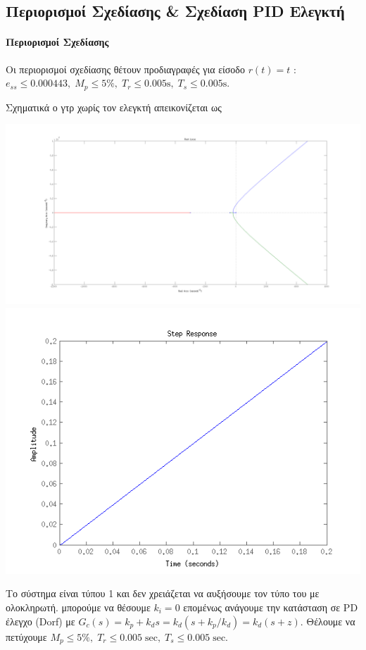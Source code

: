 \documentclass[a4paper,oneside, 10pt]{article}
\begin{document}
\subsection*{Περιορισμοί Σχεδίασης \& Σχεδίαση PID Ελεγκτή} 

\paragraph{Περιορισμοί Σχεδίασης} 

Οι περιορισμοί σχεδίασης θέτουν προδιαγραφές για είσοδο $r(t) = t $ : $e_{ss} \le 0.000443, \; M_p \le 5 \%, \; T_r \le 0.005 \mathrm s, \; T_s \le 0.005 \mathrm s$.

Σχηματικά ο γτρ χωρίς τον ελεγκτή απεικονίζεται ως

\includegraphics[width=\textwidth]{plant3_rlocus.png}
\includegraphics[width=\textwidth]{step3.png}


Το σύστημα είναι τύπου 1 και δεν χρειάζεται να αυξήσουμε τον τύπο του με ολοκληρωτή.  μπορούμε να θέσουμε $k_i = 0$ επομένως ανάγουμε την κατάσταση σε PD έλεγχο (Dorf) με $G_c(s) = k_p + k_d s = k_d (s + k_p / k_d) = k_d (s + z)$. Θέλουμε να πετύχουμε $M_p \le 5 \%, \; T_r \le 0.005 \; \mathrm{sec}, \; T_s \le 0.005 \; \mathrm {sec}$.
  
\end{document}

